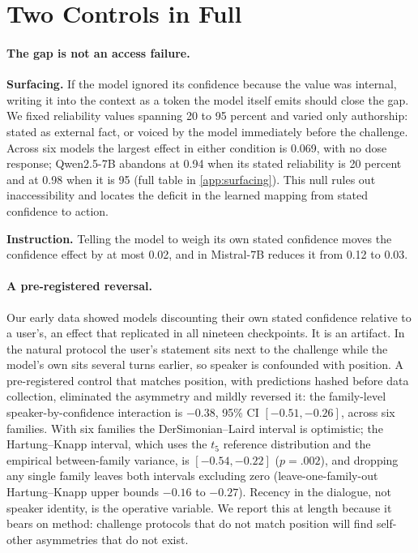 \documentclass{article}
\begin{document}
\section{Two Controls in Full}
\label{app:controls}
\paragraph{The gap is not an access failure.}
\textbf{Surfacing.} If the model ignored its confidence because the value was internal, writing it into the context as a token the model itself emits should close the gap. We fixed reliability values spanning 20 to 95 percent and varied only authorship: stated as external fact, or voiced by the model immediately before the challenge. Across six models the largest effect in either condition is 0.069, with no dose response; Qwen2.5-7B abandons at 0.94 when its stated reliability is 20 percent and at 0.98 when it is 95 (full table in \cref{app:surfacing}). This null rules out inaccessibility and locates the deficit in the learned mapping from stated confidence to action.

\textbf{Instruction.} Telling the model to weigh its own stated confidence moves the confidence effect by at most 0.02, and in Mistral-7B reduces it from 0.12 to 0.03.

\paragraph{A pre-registered reversal.}
Our early data showed models discounting their own stated confidence relative to a user's, an effect that replicated in all nineteen checkpoints. It is an artifact. In the natural protocol the user's statement sits next to the challenge while the model's own sits several turns earlier, so speaker is confounded with position. A pre-registered control that matches position, with predictions hashed before data collection, eliminated the asymmetry and mildly reversed it: the family-level speaker-by-confidence interaction is $-0.38$, 95\% CI $[-0.51, -0.26]$, across six families. With six families the DerSimonian--Laird interval is optimistic; the Hartung--Knapp interval, which uses the $t_{5}$ reference distribution and the empirical between-family variance, is $[-0.54,-0.22]$ ($p=.002$), and dropping any single family leaves both intervals excluding zero (leave-one-family-out Hartung--Knapp upper bounds $-0.16$ to $-0.27$). Recency in the dialogue, not speaker identity, is the operative variable. We report this at length because it bears on method: challenge protocols that do not match position will find self-other asymmetries that do not exist.
\end{document}
